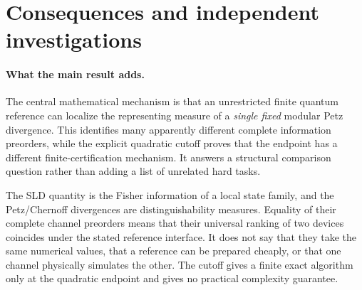 \documentclass[11pt]{article}
\begin{document}
\section{Consequences and independent investigations}
\paragraph{What the main result adds.}
The central mathematical mechanism is that an unrestricted finite quantum
reference can localize the representing measure of a \emph{single fixed}
modular Petz divergence. This identifies many apparently different complete
information preorders, while the explicit quadratic cutoff proves that the
endpoint has a different finite-certification mechanism. It answers a structural
comparison question rather than adding a list of unrelated hard tasks.

The SLD quantity is the Fisher information of a local state family, and the
Petz/Chernoff divergences are distinguishability measures. Equality of their
complete channel preorders means that their universal ranking of two devices
coincides under the stated reference interface. It does not say that they take
the same numerical values, that a reference can be prepared cheaply, or that
one channel physically simulates the other. The cutoff gives a finite exact
algorithm only at the quadratic endpoint and gives no practical complexity
guarantee.
\end{document}
